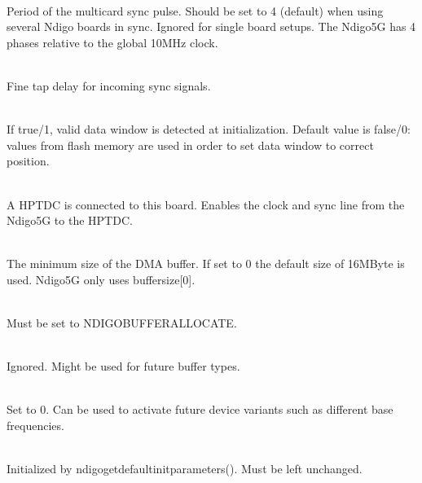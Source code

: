 			\\
			Period of the multicard sync pulse. Should be set to 4 (default) when using several Ndigo boards in sync. Ignored for single board setups. The Ndigo5G has 4 phases relative to the global 10MHz clock.\par
			
			\\
			Fine tap delay for incoming sync signals.\par
			
			\\
			If true/1, valid data window is detected at initialization. Default value is false/0: values from flash memory are used in order to set data window to correct position.

			\\
			A HPTDC is connected to this board. Enables the clock and sync line from the Ndigo5G to the HPTDC.\par

			\\
			The minimum size of the DMA buffer. If set to 0 the default size of 16MByte is used. Ndigo5G only uses \textsf{buffer\tu size[0]}.\par

			\\
			Must be set to \textsf{NDIGO\tu BUFFER\tu ALLOCATE}.\par

			\\
			Ignored. Might be used for future buffer types.\par

			\\
			Set to 0. Can be used to activate future device variants such as different base frequencies.\par

			\\
			Initialized by \textsf{ndigo\tu get\tu default\tu init\tu parameters()}. Must be left unchanged.
			
			\begin{description}
				\item[] 
				\item[] 
				\item[] 
			\end{description}
			

